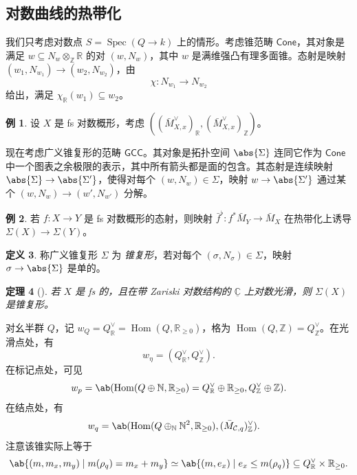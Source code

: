 \documentclass{amsart}
\newtheorem{thm}{定理}[section]
\theoremstyle{definition}
\newtheorem{defn}[thm]{定义}
\newtheorem{exm}[thm]{例}
\theoremstyle{remark}
\theoremstyle{plain}
\theoremstyle{definition}
\theoremstyle{remark}
\newcommand{\N}{\mathbb{N}}
\newcommand{\R}{\mathbb{R}}
\newcommand{\C}{\mathbb{C}}
\newcommand{\Z}{\mathbb{Z}}
\newcommand{\mc}[1]{\mathcal{#1}}
\newcommand{\ms}[1]{\mathsf{#1}}
\newcommand{\ul}[1]{\underline{#1}}
\newcommand{\1}{\mathbf{1}}
\newcommand{\2}{\mathbf{2}}
\newcommand{\3}{\mathbf{3}}
\DeclareMathOperator{\Hom}{Hom}
\DeclareMathOperator{\Spec}{Spec}
\begin{document}
\subsection{对数曲线的热带化}%
\label{sub:Tropicalization of log curves}

我们只考虑对数点 \(S = \Spec(Q \to k)\) 上的情形。考虑锥范畴 \(\ms{Cone}\)，其对象是满足 \(w \subseteq N_w \otimes_{\Z} \R\) 的对 \((w, N_w)\)，其中 \(w\) 是满维强凸有理多面锥。态射是映射 \((w_1, N_{w_1}) \to (w_2, N_{w_2})\)，由
\[ \chi \colon N_{w_1} \to N_{w_2} \]
给出，满足 \(\chi_{\R}(w_1) \subseteq w_2\)。

\begin{exm}
    设 \(X\) 是 fs 对数概形，考虑 \(( (\bar{M}_{X,x}^{\vee})_{\R}, (\bar{M}_{X,x}^{\vee})_{\Z} )\)。
\end{exm}

现在考虑广义锥复形的范畴 \(\ms{GCC}\)。其对象是拓扑空间 \(\abs{\Sigma}\) 连同它作为 \(\ms{Cone}\) 中一个图表之余极限的表示，其中所有箭头都是面的包含。其态射是连续映射 \(\abs{\Sigma} \to \abs{\Sigma'}\)，使得对每个 \((w, N_w) \in \Sigma\)，映射 \(w \to \abs{\Sigma'}\) 通过某个 \((w, N_w) \to (w', N_{w'})\) 分解。

\begin{exm}
    若 \(f \colon X \to Y\) 是 fs 对数概形的态射，则映射 \(\bar{f}^{\flat} \colon f^* \bar{M}_Y \to \bar{M}_X\) 在热带化上诱导 \(\Sigma(X) \to \Sigma(Y)\)。
\end{exm}

\begin{defn}
    称广义锥复形 \(\Sigma\) 为 \textit{锥复形}，若对每个 \((\sigma, N_{\sigma}) \in \Sigma\)，映射 \(\sigma \to \abs{\Sigma}\) 是单的。
\end{defn}

\begin{thm}[{\cite{ACP2015}}]
    若 \(X\) 是 fs 的，且在带 Zariski 对数结构的 \(\ul{\C}\) 上对数光滑，则 \(\Sigma(X)\) 是锥复形。
\end{thm}

对幺半群 \(Q\)，记 \(w_Q = Q_{\R}^{\vee} = \Hom(Q, \R_{\geq 0})\)，格为 \(\Hom(Q, \Z) = Q_{\Z}^{\vee}\)。在光滑点处，有
\[ w_{\eta} = (Q_{\R}^{\vee}, Q_{\Z}^{\vee}). \]
在标记点处，可见
\[ w_p = \ab(\Hom (Q \oplus \N, \R_{\geq 0}) = Q_{\R}^{\vee} \oplus \R_{\geq 0}, Q_{\Z}^{\vee}\oplus \Z). \]
在结点处，有
\begin{align*}
    w_q &= \ab(\Hom(Q \oplus_{\N} \N^2, \R_{\geq 0}), ( \bar{M}_{\mc{C}, q} )_{\Z}^{\vee}).
\end{align*}
注意该锥实际上等于
\[ \ab\{(m, m_x, m_y) \mid m(\rho_q) = m_x + m_y \} \simeq \ab\{(m, e_x) \mid e_x \leq m(\rho_q) \} \subseteq Q_{\R}^{\vee} \times \R_{\geq 0}. \]
\end{document}
